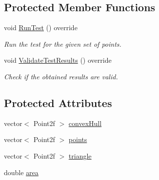 \subsection*{Protected Member Functions}
\begin{DoxyCompactItemize}
\item 
void \hyperlink{classmultiscaletest_1_1MinEnclosingTriangleFinderTest_a9a0c1dfbe0e0b2451b1c4076967f47d9}{Run\-Test} () override
\begin{DoxyCompactList}\small\item\em Run the test for the given set of points. \end{DoxyCompactList}\item 
void \hyperlink{classmultiscaletest_1_1MinEnclosingTriangleFinderTest_ab5dd9317ad241d04c8338602c09036fe}{Validate\-Test\-Results} () override
\begin{DoxyCompactList}\small\item\em Check if the obtained results are valid. \end{DoxyCompactList}\end{DoxyCompactItemize}
\subsection*{Protected Attributes}
\begin{DoxyCompactItemize}
\item 
vector$<$ Point2f $>$ \hyperlink{classmultiscaletest_1_1MinEnclosingTriangleFinderTest_a309e2484e202fab797520fc15517d95d}{convex\-Hull}
\item 
vector$<$ Point2f $>$ \hyperlink{classmultiscaletest_1_1MinEnclosingTriangleFinderTest_ace108c67a933a0d79c05b304a9683764}{points}
\item 
vector$<$ Point2f $>$ \hyperlink{classmultiscaletest_1_1MinEnclosingTriangleFinderTest_a02aa9bcd10630d27293e656233e3f64e}{triangle}
\item 
double \hyperlink{classmultiscaletest_1_1MinEnclosingTriangleFinderTest_a80c049e5307e5f316ad0b73964ea90bf}{area}
\end{DoxyCompactItemize}
